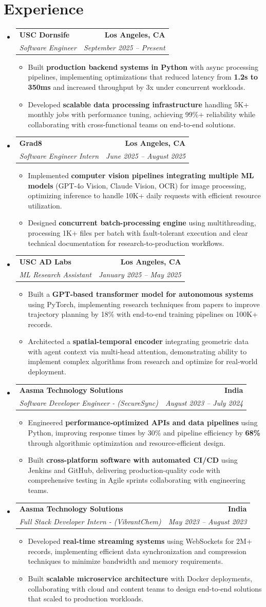 \documentclass[letterpaper,10pt]{article}
\makeatletter
\newcommand{\resumeItem}[1]{\item\small{{#1 \vspace{-2pt}}}}
\newcommand{\resumeSubheading}[4]{\vspace{-1pt}\item\begin{tabular*}{1.0\textwidth}[t]{l@{\extracolsep{\fill}}r}\textbf{#1} & \textbf{\small #2} \\\textit{\small#3} & \textit{\small #4} \\\end{tabular*}\vspace{-2pt}}
\newcommand{\resumeSubHeadingListStart}{\begin{itemize}[leftmargin=0.0in, label={}]}
\newcommand{\resumeSubHeadingListEnd}{\end{itemize}}
\newcommand{\resumeItemListStart}{\begin{itemize}[leftmargin=0.15in,label=\textbullet,itemsep=2pt,topsep=0pt,parsep=0pt,partopsep=0pt]}
\newcommand{\resumeItemListEnd}{\end{itemize}\vspace{-4pt}}
\makeatother
\begin{document}
\section{Experience}
\resumeSubHeadingListStart
\resumeSubheading{USC Dornsife}{Los Angeles, CA}{Software Engineer}{September 2025 -- Present}
\resumeItemListStart
\resumeItem{Built \textbf{production backend systems in Python} with async processing pipelines, implementing optimizations that reduced latency from \textbf{1.2s to 350ms} and increased throughput by 3x under concurrent workloads.}
\resumeItem{Developed \textbf{scalable data processing infrastructure} handling 5K+ monthly jobs with performance tuning, achieving 99\%+ reliability while collaborating with cross-functional teams on end-to-end solutions.}
\resumeItemListEnd
\resumeSubheading{Grad8}{Los Angeles, CA}{Software Engineer Intern}{June 2025 -- August 2025}
\resumeItemListStart
\resumeItem{Implemented \textbf{computer vision pipelines integrating multiple ML models} (GPT-4o Vision, Claude Vision, OCR) for image processing, optimizing inference to handle 10K+ daily requests with efficient resource utilization.}
\resumeItem{Designed \textbf{concurrent batch-processing engine} using multithreading, processing 1K+ files per batch with fault-tolerant execution and clear technical documentation for research-to-production workflows.}
\resumeItemListEnd
\resumeSubheading{USC AD Labs}{Los Angeles, CA}{ML Research Assistant}{January 2025 -- May 2025}
\resumeItemListStart
\resumeItem{Built a \textbf{GPT-based transformer model for autonomous systems} using PyTorch, implementing research techniques from papers to improve trajectory planning by 18\% with end-to-end training pipelines on 100K+ records.}
\resumeItem{Architected a \textbf{spatial-temporal encoder} integrating geometric data with agent context via multi-head attention, demonstrating ability to implement complex algorithms from research and optimize for real-world deployment.}
\resumeItemListEnd
\resumeSubheading{Aasma Technology Solutions}{India}{Software Developer Engineer - (SecureSync)}{August 2023 -- July 2024}
\resumeItemListStart
\resumeItem{Engineered \textbf{performance-optimized APIs and data pipelines} using Python, improving response times by 30\% and pipeline efficiency by \textbf{68\%} through algorithmic optimization and resource-efficient design.}
\resumeItem{Built \textbf{cross-platform software with automated CI/CD} using Jenkins and GitHub, delivering production-quality code with comprehensive testing in Agile sprints collaborating with engineering teams.}
\resumeItemListEnd
\resumeSubheading{Aasma Technology Solutions}{India}{Full Stack Developer Intern - (VibrantChem)}{May 2023 -- August 2023}
\resumeItemListStart
\resumeItem{Developed \textbf{real-time streaming systems} using WebSockets for 2M+ records, implementing efficient data synchronization and compression techniques to minimize bandwidth and memory requirements.}
\resumeItem{Built \textbf{scalable microservice architecture} with Docker deployments, collaborating with cloud and content teams to design end-to-end solutions that scaled to production workloads.}
\resumeItemListEnd
\resumeSubHeadingListEnd
\vspace{-14pt}
\end{document}
